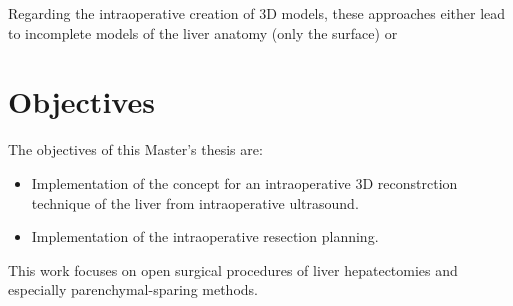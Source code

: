 Regarding the intraoperative creation of 3D models, these approaches either lead to
incomplete models of the liver anatomy (only the surface) or  


\section{Objectives} 
The objectives of this Master's thesis are:
\begin{itemize}
  \item Implementation of the concept for an intraoperative 3D reconstrction
  technique of the liver from intraoperative ultrasound. 
  \item Implementation of the intraoperative resection planning.
\end{itemize}
This work focuses on open surgical procedures of liver hepatectomies and
especially parenchymal-sparing methods.









